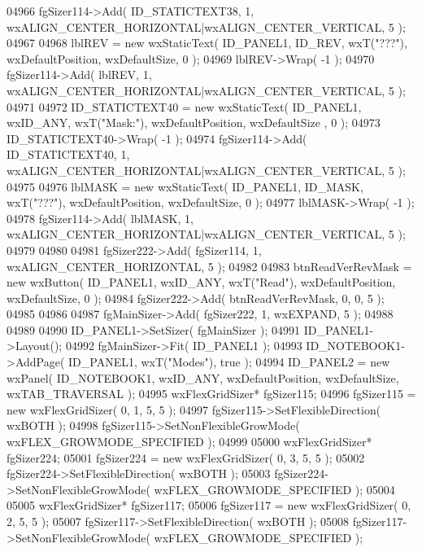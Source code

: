 \begin{DoxyCode}
04966     fgSizer114->Add( ID_STATICTEXT38, 1, wxALIGN\_CENTER\_HORIZONTAL|wxALIGN\_CENTER\_VERTICAL, 5 );
04967     
04968     lblREV = \textcolor{keyword}{new} wxStaticText( ID_PANEL1, ID_REV, wxT(\textcolor{stringliteral}{"???"}), wxDefaultPosition, wxDefaultSize, 0 );
04969     lblREV->Wrap( -1 );
04970     fgSizer114->Add( lblREV, 1, wxALIGN\_CENTER\_HORIZONTAL|wxALIGN\_CENTER\_VERTICAL, 5 );
04971     
04972     ID_STATICTEXT40 = \textcolor{keyword}{new} wxStaticText( ID_PANEL1, wxID\_ANY, wxT(\textcolor{stringliteral}{"Mask:"}), wxDefaultPosition, wxDefaultSize
      , 0 );
04973     ID_STATICTEXT40->Wrap( -1 );
04974     fgSizer114->Add( ID_STATICTEXT40, 1, wxALIGN\_CENTER\_HORIZONTAL|wxALIGN\_CENTER\_VERTICAL, 5 );
04975     
04976     lblMASK = \textcolor{keyword}{new} wxStaticText( ID_PANEL1, ID_MASK, wxT(\textcolor{stringliteral}{"???"}), wxDefaultPosition, wxDefaultSize, 0 );
04977     lblMASK->Wrap( -1 );
04978     fgSizer114->Add( lblMASK, 1, wxALIGN\_CENTER\_HORIZONTAL|wxALIGN\_CENTER\_VERTICAL, 5 );
04979     
04980     
04981     fgSizer222->Add( fgSizer114, 1, wxALIGN\_CENTER\_HORIZONTAL, 5 );
04982     
04983     btnReadVerRevMask = \textcolor{keyword}{new} wxButton( ID_PANEL1, wxID\_ANY, wxT(\textcolor{stringliteral}{"Read"}), wxDefaultPosition, wxDefaultSize, 0
       );
04984     fgSizer222->Add( btnReadVerRevMask, 0, 0, 5 );
04985     
04986     
04987     fgMainSizer->Add( fgSizer222, 1, wxEXPAND, 5 );
04988     
04989     
04990     ID_PANEL1->SetSizer( fgMainSizer );
04991     ID_PANEL1->Layout();
04992     fgMainSizer->Fit( ID_PANEL1 );
04993     ID_NOTEBOOK1->AddPage( ID_PANEL1, wxT(\textcolor{stringliteral}{"Modes"}), \textcolor{keyword}{true} );
04994     ID_PANEL2 = \textcolor{keyword}{new} wxPanel( ID_NOTEBOOK1, wxID\_ANY, wxDefaultPosition, wxDefaultSize, wxTAB\_TRAVERSAL );
04995     wxFlexGridSizer* fgSizer115;
04996     fgSizer115 = \textcolor{keyword}{new} wxFlexGridSizer( 0, 1, 5, 5 );
04997     fgSizer115->SetFlexibleDirection( wxBOTH );
04998     fgSizer115->SetNonFlexibleGrowMode( wxFLEX\_GROWMODE\_SPECIFIED );
04999     
05000     wxFlexGridSizer* fgSizer224;
05001     fgSizer224 = \textcolor{keyword}{new} wxFlexGridSizer( 0, 3, 5, 5 );
05002     fgSizer224->SetFlexibleDirection( wxBOTH );
05003     fgSizer224->SetNonFlexibleGrowMode( wxFLEX\_GROWMODE\_SPECIFIED );
05004     
05005     wxFlexGridSizer* fgSizer117;
05006     fgSizer117 = \textcolor{keyword}{new} wxFlexGridSizer( 0, 2, 5, 5 );
05007     fgSizer117->SetFlexibleDirection( wxBOTH );
05008     fgSizer117->SetNonFlexibleGrowMode( wxFLEX\_GROWMODE\_SPECIFIED );

\end{DoxyCode}

